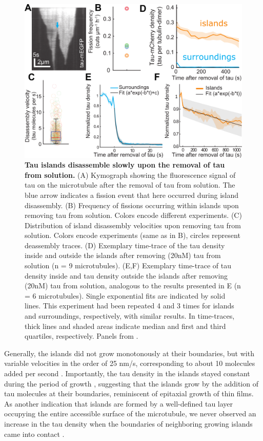 \begin{figure}
	\centering
	\includegraphics[width=1\linewidth]{Figures/tauSHRINK.png}
	\caption[Tau islands disassemble slowly upon the removal of tau from solution.]{
	\textbf{Tau islands disassemble slowly upon the removal of tau from solution.} (A) Kymograph showing the fluorescence signal of tau on the microtubule after the removal of tau from solution. The blue arrow indicates a fission event that here occurred during island disassembly. (B) Frequency of fissions occurring within islands upon removing tau from solution. Colors encode different experiments. (C) Distribution of island disassembly velocities upon removing tau from solution. Colors encode experiments (same as in B), circles represent deassembly traces. (D) Exemplary time-trace of the tau density inside and outside the islands after removing (20nM) tau from solution (n = 9 microtubules). (E,F) Exemplary time-trace of tau density inside and tau density outside the islands after removing (20nM) tau from solution, analogous to the results presented in E (n = 6 microtubules). Single exponential fits are indicated by solid lines. This experiment had been repeated 4 and 3 times for islands and surroundings, respectively, with similar results. In time-traces, thick lines and shaded areas indicate median and first and third quartiles, respectively. Panels from \cite{Siahaan2019a}.
		}\label{tauSHRINK}
\end{figure}
Generally, the islands did not grow monotonously at their boundaries, but with variable velocities in the order of 25 nm/s, corresponding to about 10 molecules added per second . Importantly, the tau density in the islands stayed constant during the period of growth , suggesting that the islands grow by the addition of tau molecules at their boundaries, reminiscent of epitaxial growth of thin films. As another indication that islands are formed by a well-defined tau layer occupying the entire accessible surface of the microtubule, we never observed an increase in the tau density when the boundaries of neighboring growing islands came into contact .\par

